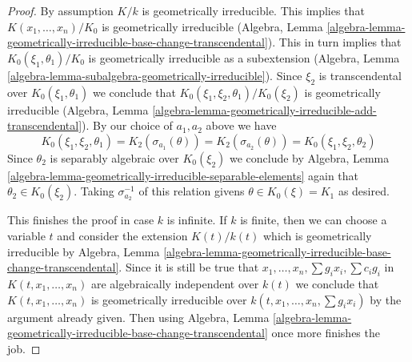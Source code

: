 \begin{proof}
\medskip\noindent
By assumption $K/k$ is geometrically irreducible. This implies
that $K(x_1, \ldots, x_n)/K_0$ is geometrically irreducible
(Algebra, Lemma
\ref{algebra-lemma-geometrically-irreducible-base-change-transcendental}).
This in turn implies that $K_0(\xi_1, \theta_1)/K_0$
is geometrically irreducible as a subextension
(Algebra, Lemma \ref{algebra-lemma-subalgebra-geometrically-irreducible}).
Since $\xi_2$ is transcendental over $K_0(\xi_1, \theta_1)$
we conclude that $K_0(\xi_1, \xi_2, \theta_1)/K_0(\xi_2)$
is geometrically irreducible (Algebra, Lemma
\ref{algebra-lemma-geometrically-irreducible-add-transcendental}).
By our choice of $a_1, a_2$ above we have
$$
K_0(\xi_1, \xi_2, \theta_1) =
K_2(\sigma_{a_1}(\theta)) =
K_2(\sigma_{a_2}(\theta)) =
K_0(\xi_1, \xi_2, \theta_2)
$$
Since $\theta_2$ is separably algebraic over $K_0(\xi_2)$
we conclude by Algebra, Lemma
\ref{algebra-lemma-geometrically-irreducible-separable-elements} again that
$\theta_2 \in K_0(\xi_2)$. Taking $\sigma_{a_2}^{-1}$
of this relation givens $\theta \in K_0(\xi) = K_1$ as desired.

\medskip\noindent
This finishes the proof in case $k$ is infinite. If $k$ is finite,
then we can choose a variable $t$ and consider the extension
$K(t)/k(t)$ which is geometrically irreducible by
Algebra, Lemma
\ref{algebra-lemma-geometrically-irreducible-base-change-transcendental}.
Since it is still be true that
$x_1, \ldots, x_n, \sum g_ix_i, \sum c_ig_i$
in $K(t, x_1, \ldots, x_n)$ are algebraically independent over $k(t)$
we conclude that $K(t, x_1, \ldots, x_n)$
is geometrically irreducible over
$k(t, x_1, \ldots, x_n, \sum g_ix_i)$
by the argument already given.
Then using Algebra, Lemma
\ref{algebra-lemma-geometrically-irreducible-base-change-transcendental}
once more finishes the job.
\end{proof}